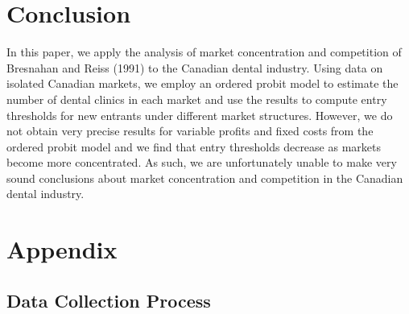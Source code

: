 \documentclass[a4paper,11pt]{article}
\begin{document}
\section{Conclusion}
In this paper, we apply the analysis of market concentration and competition of Bresnahan and Reiss (1991) to the Canadian dental industry. Using data on isolated Canadian markets, we employ an ordered probit model to estimate the number of dental clinics in each market and use the results to compute entry thresholds for new entrants under different market structures. However, we do not obtain very precise results for variable profits and fixed costs from the ordered probit model and we find that entry thresholds decrease as markets become more concentrated. As such, we are unfortunately unable to make very sound conclusions about market concentration and competition in the Canadian dental industry.

\newpage
\printbibliography

\newpage
\section*{Appendix}
\subsection*{Data Collection Process}
\end{document}
